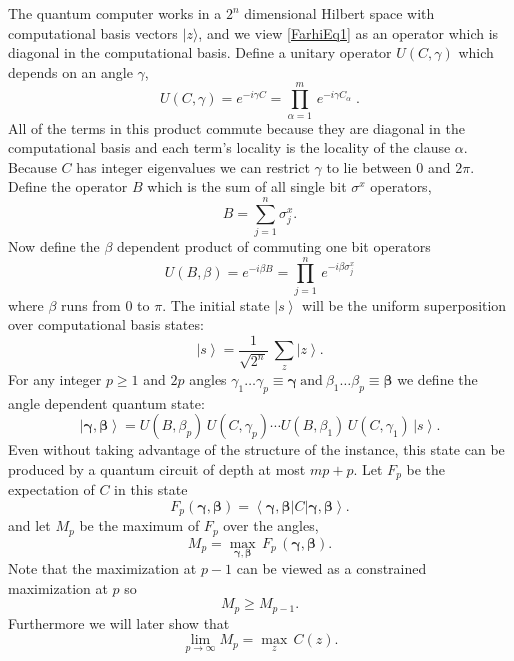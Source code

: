 \documentclass[t11pt,reprint,preprint,preprintnumbers]{revtex4}
\newcommand{\bra}[1]{\left\langle #1 \right|}
\newcommand{\ket}[1]{\left|#1\right\rangle}
\DeclareMathOperator*{\maxZ}{max}
\begin{document}
The quantum computer works in a $2^n$ dimensional Hilbert space with computational basis vectors $|z\rangle$, and we view \eqref{FarhiEq1} as an operator which is diagonal in the computational basis.  Define a unitary operator $U (C,\gamma)$ which depends on an angle $\gamma$,
\begin{equation}
U (C,\gamma) = e^{-i\gamma C} = \prod\limits^{m}_{\alpha =1}\, e^{-i\gamma C_\alpha } \;.
\label{FarhiEq3}
\end{equation}
All of the terms in this product commute because they are diagonal in the computational basis and each term's locality is the locality of the clause $\alpha$.  Because $C$ has integer eigenvalues we can restrict $\gamma$ to lie between 0 and $2\pi$.  Define the operator $B$ which is the sum of all single bit $\sigma^x $ operators,
\begin{equation}
B = \sum\limits^n_{j=1} \sigma^x_j.
\label{FarhiEq4}
\end{equation}
Now define the $\beta$ dependent product of commuting one bit operators
\begin{equation}
U (B, \beta) = e^{-i\beta B} = \prod\limits^n_{j=1}\, e^{-i \beta  \sigma^x_j}
\label{FarhiEq5}
\end{equation}
where $\beta$ runs from $0$ to $\pi$.  The initial state $ \ket{s} $ will be the uniform superposition over computational basis states:
\begin{equation}
\ket{s} = \frac{1}{\sqrt{2^n}}\ \sum\limits_z \ket{z} .
\label{FarhiEq6}
\end{equation}
For any integer $ p \geq 1$ and $2p$ angles $\gamma_1 \ldots \gamma_p \equiv \boldsymbol{\gamma} \ \text{and}\ \beta_1\ldots \beta_p \equiv \boldsymbol{\beta}$  we define the angle dependent quantum state:
\begin{equation}
\ket{\boldsymbol{\gamma}, \boldsymbol{\beta}} = U (B, \beta_p) \, U (C, \gamma_p) \cdots U (B, \beta_1) \, U (C, \gamma_1)\, \ket{s} .
\label{FarhiEq7}
\end{equation}
Even without taking advantage of the structure of the instance, this state can be produced by a quantum circuit of depth at most $m p + p$. Let $F_p$ be the expectation of $C$ in this state 
\begin{equation}
F_p (\boldsymbol{\gamma}, \boldsymbol{\beta}) = \bra{\boldsymbol{\gamma}, \boldsymbol{\beta}} C  \ket{\boldsymbol{\gamma}, \boldsymbol{\beta}} .
\label{FarhiEq8}
\end{equation}
and let $M_p$ be the maximum of $F_p$ over the angles,
\begin{equation}
M_p = \maxZ_{\boldsymbol{\gamma}, \boldsymbol{\beta}}\, F_p\, (\boldsymbol{\gamma}, \boldsymbol{\beta}).
\label{FarhiEq9}
\end{equation}
Note that the maximization at $p-1$ can be viewed as a constrained maximization at $p$ so 
\begin{equation}
M_p \geq M_{p-1}.
\label{FarhiEq10}
\end{equation}
Furthermore we will later show that
\begin{equation}
\lim_{p \to \infty} M_p = \maxZ_z\, C(z) .
\label{FarhiEq11}
\end{equation}
\end{document}

